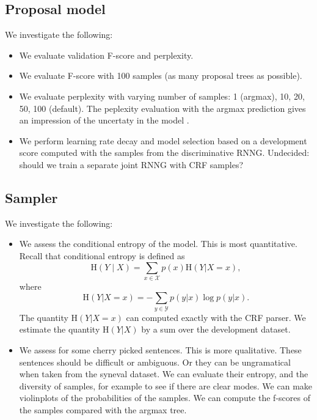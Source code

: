 \subsection{Proposal model}
  We investigate the following:
  \begin{itemize}
    \item We evaluate validation F-score and perplexity.
    \item We evaluate F-score with 100 samples (as many proposal trees as possible).
    \item We evaluate perplexity with varying number of samples: 1 (argmax), 10, 20, 50, 100 (default). The peplexity evaluation with the argmax prediction gives an impression of the uncertaty in the model \citep{buys2018exact}.
    \item  We perform learning rate decay and model selection based on a development score computed with the samples from the discriminative RNNG. Undecided: should we train a separate joint RNNG with CRF samples?
  \end{itemize}

\subsection{Sampler}
  We investigate the following:
  \begin{itemize}
    \item We assess the conditional entropy of the model. This is most quantitative. Recall that conditional entropy is defined as
    \begin{equation}
      \text{H}(Y \mid X ) = \sum_{x \in \mathcal{X}} p(x)\text{H}(Y|X = x),
    \end{equation}
    where
    \begin{equation}
      \text{H}(Y|X = x) = - \sum_{y \in \mathcal{Y}} p(y|x) \log p(y|x).
    \end{equation}
    The quantity $\text{H}(Y|X = x)$ can computed exactly with the CRF parser. We estimate the quantity $\text{H}(Y|X)$ by a sum over the development dataset.
    \item We assess for some cherry picked sentences. This is more qualitative. These sentences should be difficult or ambiguous. Or they can be ungramatical when taken from the syneval dataset. We can evaluate their entropy, and the diversity of samples, for example to see if there are clear modes. We can make violinplots of the probabilities of the samples. We can compute the f-scores of the samples compared with the argmax tree.
  \end{itemize}

